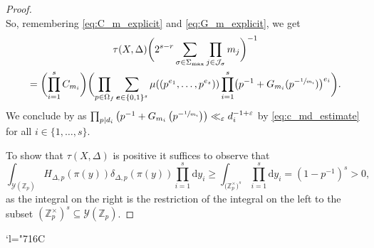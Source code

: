 \documentclass[JEP,XML,SOM,Unicode,published]{cedram}
\newcommand{\Changelback}{\mathcode`l="716C}
\let\epsilon\varepsilon
\newcommand{\bfe}{\boldsymbol{e}}
\newcommand\ZZ{\mathbb{Z}}
\newcommand{\ii}[1]{\mathcal{J}_{#1}}
\theoremstyle{definition}
\numberwithin{theorem}{section}
\begin{document}
\begin{proof}
\[\]
So, remembering \eqref{eq:C_m_explicit} and \eqref{eq:G_m_explicit}, we get
\begin{multline*}
\tau({X,\Delta})
\biggl(2^{s-r}\sum_{\sigma\in\Sigma_{\max}}\prod_{j\in\ii{\sigma}} m_j\biggr)^{-1}
\\
=
\biggl(\prod_{i=1}^s C_{m_i}\biggr)
\biggl (
\prod_{p\in\Omega_f}\sum_{\bfe\in\{0,1\}^s} \mu ((p^{e_1},\dots,p^{e_s}))
\prod_{i=1}^s\bigl (p^{-1}+G_{m_i} (p^{-\sfrac 1{m_i}})\bigr)^{e_i}
\biggr).
\end{multline*}
We conclude by \cite[Lem.\,11.15(e)]{MR1679841} as
$\prod_{p\mid d_i}\left(p^{-1}+G_{m_i}\left(p^{-\sfrac 1{m_i}}\right)\right)\ll_\epsilon d_i^{-1+\epsilon}$
by \eqref{eq:c_md_estimate} for all $i\in\{1,\dots,s\}$.

To show that $\tau({X,\Delta})$ is positive it suffices to observe that
\[
\int_{\mathscr Y(\ZZ_p)}H_{\Delta,p}(\pi(y))\delta_{\Delta,p} (\pi(y)) \prod_{i=1}^s\mathrm d y_i
\geq
\int_{\mathscr (\ZZ_p^\times)^s} \prod_{i=1}^s\mathrm d y_i =(1-p^{-1})^s >0,
\]
as the integral on the right is the restriction of the integral on the left to the subset
$(\ZZ_p^\times)^s \subseteq \mathscr Y(\ZZ_p)$.
\end{proof}

\Changelback
\backmatter


\end{document}
